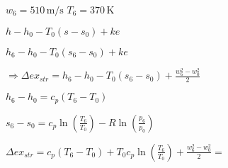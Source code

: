 \( w_6 = 510 \, \text{m/s} \)  
\( T_6 = 370 \, \text{K} \)  

\( h - h_0 - T_0 (s - s_0) + ke \)  

\( h_6 - h_0 - T_0 (s_6 - s_0) + ke \)  

\( \Rightarrow \Delta ex_{str} = h_6 - h_0 - T_0 (s_6 - s_0) + \frac{w_6^2 - w_0^2}{2} \)  

\( h_6 - h_0 = c_p (T_6 - T_0) \)  

\( s_6 - s_0 = c_p \ln \left( \frac{T_6}{T_0} \right) - R \ln \left( \frac{p_6}{p_0} \right) \)  

\( \Delta ex_{str} = c_p (T_6 - T_0) + T_0 c_p \ln \left( \frac{T_6}{T_0} \right) + \frac{w_6^2 - w_0^2}{2} = \)